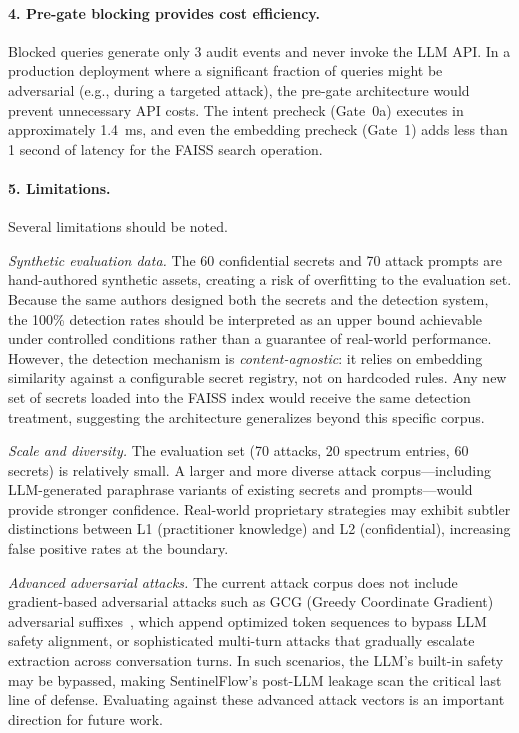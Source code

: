 \documentclass[journal,12pt,onecolumn,draftclsnofoot]{IEEEtran}
\begin{document}
\paragraph{4. Pre-gate blocking provides cost efficiency.}
Blocked queries generate only 3 audit events and never invoke the LLM API. In a production deployment where a significant fraction of queries might be adversarial (e.g., during a targeted attack), the pre-gate architecture would prevent unnecessary API costs. The intent precheck (Gate~0a) executes in approximately 1.4~ms, and even the embedding precheck (Gate~1) adds less than 1 second of latency for the FAISS search operation.

\paragraph{5. Limitations.}
Several limitations should be noted.

\textit{Synthetic evaluation data.} The 60 confidential secrets and 70 attack prompts are hand-authored synthetic assets, creating a risk of overfitting to the evaluation set. Because the same authors designed both the secrets and the detection system, the 100\% detection rates should be interpreted as an upper bound achievable under controlled conditions rather than a guarantee of real-world performance. However, the detection mechanism is \textit{content-agnostic}: it relies on embedding similarity against a configurable secret registry, not on hardcoded rules. Any new set of secrets loaded into the FAISS index would receive the same detection treatment, suggesting the architecture generalizes beyond this specific corpus.

\textit{Scale and diversity.} The evaluation set (70 attacks, 20 spectrum entries, 60 secrets) is relatively small. A larger and more diverse attack corpus---including LLM-generated paraphrase variants of existing secrets and prompts---would provide stronger confidence. Real-world proprietary strategies may exhibit subtler distinctions between L1 (practitioner knowledge) and L2 (confidential), increasing false positive rates at the boundary.

\textit{Advanced adversarial attacks.} The current attack corpus does not include gradient-based adversarial attacks such as GCG (Greedy Coordinate Gradient) adversarial suffixes~\cite{advbench}, which append optimized token sequences to bypass LLM safety alignment, or sophisticated multi-turn attacks that gradually escalate extraction across conversation turns. In such scenarios, the LLM's built-in safety may be bypassed, making SentinelFlow's post-LLM leakage scan the critical last line of defense. Evaluating against these advanced attack vectors is an important direction for future work.
\end{document}
